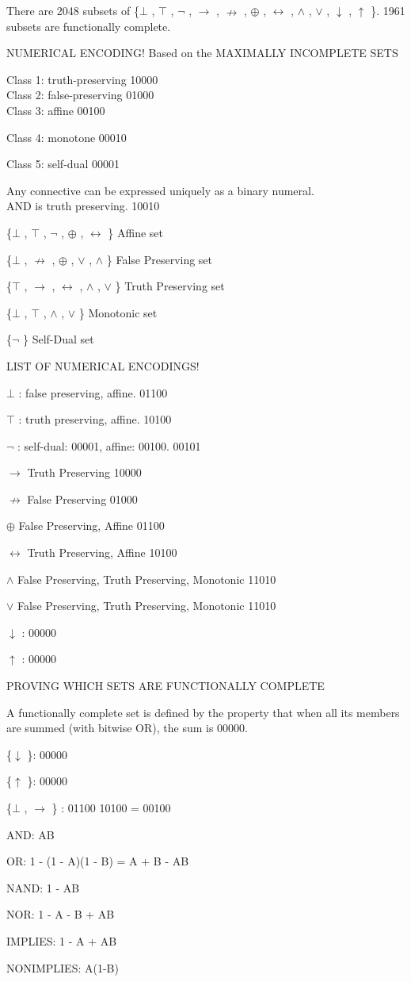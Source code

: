 There are 2048 subsets of \{$\bot$ , $\top$ , $\neg$ , $\to$ , $\nrightarrow$ , $\oplus$ , $\leftrightarrow$ , $\land$ , $\lor$ , $\downarrow$ , $\uparrow$ \}. 1961
subsets are functionally complete.

NUMERICAL ENCODING! Based on the MAXIMALLY INCOMPLETE SETS

Class 1: truth-preserving 10000\\
Class 2: false-preserving 01000\\
Class 3: affine 00100

Class 4: monotone 00010

Class 5: self-dual 00001

Any connective can be expressed uniquely as a binary numeral.\\
AND is truth preserving. 10010

\{$\bot$ , $\top$ , $\neg$ , $\oplus$ , $\leftrightarrow$ \} Affine set

\{$\bot$ , $\nrightarrow$ , $\oplus$ , $\lor$ , $\land$ \} False Preserving set

\{$\top$ , $\to$ , $\leftrightarrow$ , $\land$ , $\lor$ \} Truth Preserving set

\{$\bot$ , $\top$ , $\land$ , $\lor$ \} Monotonic set

\{$\neg$ \} Self-Dual set

LIST OF NUMERICAL ENCODINGS!

$\bot$ : false preserving, affine. 01100

$\top$ : truth preserving, affine. 10100

$\neg$ : self-dual: 00001, affine: 00100. 00101

$\to$  Truth Preserving 10000

$\nrightarrow$  False Preserving 01000

$\oplus$  False Preserving, Affine 01100

$\leftrightarrow$  Truth Preserving, Affine 10100

$\land$  False Preserving, Truth Preserving, Monotonic 11010

$\lor$  False Preserving, Truth Preserving, Monotonic 11010

$\downarrow$ : 00000

$\uparrow$ : 00000

PROVING WHICH SETS ARE FUNCTIONALLY COMPLETE

A functionally complete set is defined by the property that when all its
members are summed (with bitwise OR), the sum is 00000.

\{$\downarrow$ \}: 00000

\{$\uparrow$ \}: 00000

\{$\bot$ , $\to$ \} : 01100 \textbar\textbar{} 10100 = 00100

AND: AB

OR: 1 - (1 - A)(1 - B) = A + B - AB

NAND: 1 - AB

NOR: 1 - A - B + AB

IMPLIES: 1 - A + AB

NONIMPLIES: A(1-B)